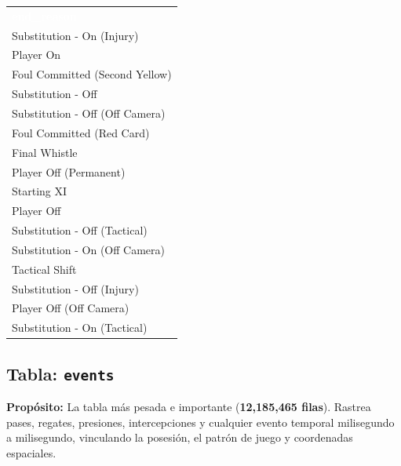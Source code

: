 \documentclass[12pt,a4paper]{article}
\newcommand{\thead}[1]{%
  \cellcolor{tableheader}\textcolor{white}{\textbf{#1}}%
}
\begin{document}
\begin{center}
\small
\begin{tabular}{l}
\rowcolor{tableheader}
\thead{end\_reason} \\

\rowcolor{tablealt} Substitution - On (Injury) \\
\rowcolor{tablerow} Player On \\
\rowcolor{tablealt} Foul Committed (Second Yellow) \\
\rowcolor{tablerow} Substitution - Off \\
\rowcolor{tablealt} Substitution - Off (Off Camera) \\
\rowcolor{tablerow} Foul Committed (Red Card) \\
\rowcolor{tablealt} Final Whistle \\
\rowcolor{tablerow} Player Off (Permanent) \\
\rowcolor{tablealt} Starting XI \\
\rowcolor{tablerow} Player Off \\
\rowcolor{tablealt} Substitution - Off (Tactical) \\
\rowcolor{tablerow} Substitution - On (Off Camera) \\
\rowcolor{tablealt} Tactical Shift \\
\rowcolor{tablerow} Substitution - Off (Injury) \\
\rowcolor{tablealt} Player Off (Off Camera) \\
\rowcolor{tablerow} Substitution - On (Tactical) \\

\end{tabular}
\end{center}
\newpage

\subsection{Tabla: \texttt{events}}

\textbf{Propósito:} La tabla más pesada e importante (\textbf{12,185,465 filas}). Rastrea pases, regates, presiones, intercepciones y cualquier evento temporal milisegundo a milisegundo, vinculando la posesión, el patrón de juego y coordenadas espaciales.
\end{document}
